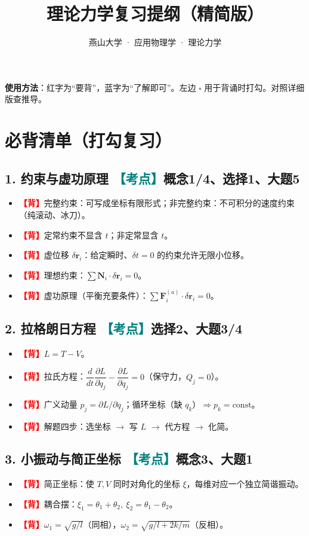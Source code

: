 \documentclass[UTF8,a4paper,11pt]{ctexart}
\title{\textbf{理论力学复习提纲（精简版）}}
\author{燕山大学 · 应用物理学 · 理论力学}
\date{}
\newcommand{\bp}{\textcolor{red}{\textbf{【背】}}}
\newcommand{\km}{\textcolor{teal}{\textbf{【考点】}}}
\begin{document}
\maketitle

\noindent\textbf{使用方法}：红字为“要背”，蓝字为“了解即可”。左边 $\square$ 用于背诵时打勾。对照详细版查推导。

\section{必背清单（打勾复习）}

\subsection*{1. 约束与虚功原理 \km 概念1/4、选择1、大题5}
\begin{itemize}[label=$\square$]
  \item \bp 完整约束：可写成坐标有限形式；非完整约束：不可积分的速度约束（纯滚动、冰刀）。
  \item \bp 定常约束不显含 $t$；非定常显含 $t$。
  \item \bp 虚位移 $\delta\bm r_i$：给定瞬时、$\delta t=0$ 的约束允许无限小位移。
  \item \bp 理想约束：$\sum\bm N_i\cdot\delta\bm r_i=0$。
  \item \bp 虚功原理（平衡充要条件）：$\sum\bm F_i^{(a)}\cdot\delta\bm r_i=0$。
\end{itemize}

\subsection*{2. 拉格朗日方程 \km 选择2、大题3/4}
\begin{itemize}[label=$\square$]
  \item \bp $L=T-V$。
  \item \bp 拉氏方程：$\dfrac{d}{dt}\dfrac{\partial L}{\partial\dot q_j}-\dfrac{\partial L}{\partial q_j}=0$（保守力，$Q_j=0$）。
  \item \bp 广义动量 $p_j=\partial L/\partial\dot q_j$；循环坐标（缺 $q_k$）$\Rightarrow p_k=\text{const}$。
  \item \bp 解题四步：选坐标 $\rightarrow$ 写 $L$ $\rightarrow$ 代方程 $\rightarrow$ 化简。
\end{itemize}

\subsection*{3. 小振动与简正坐标 \km 概念3、大题1}
\begin{itemize}[label=$\square$]
  \item \bp 简正坐标：使 $T,V$ 同时对角化的坐标 $\xi$，每维对应一个独立简谐振动。
  \item \bp 耦合摆：$\xi_1=\theta_1+\theta_2,\ \xi_2=\theta_1-\theta_2$。
  \item \bp $\omega_1=\sqrt{g/l}$（同相），$\omega_2=\sqrt{g/l+2k/m}$（反相）。
\end{itemize}
\end{document}
